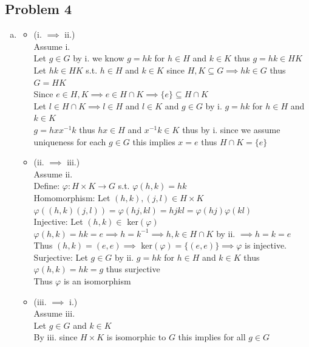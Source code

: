 \documentclass[12pt, letterpaper]{article}
\theoremstyle{definition}
\begin{document}
\subsection*{Problem 4}
\begin{enumerate}[(a)]
    \item \begin{itemize}
        \item (i. $\implies$ ii.)\\
        Assume i.\\
        Let $g \in G$ by i. we know $g=hk$ for $h \in H$ and $k \in K$ thus $g=hk\in HK$\\
        Let $hk \in HK$ s.t. $h \in H$ and $k \in K$ since $H,K \subseteq G \implies hk \in G$ thus $G=HK$\\
        Since $e\in H,K \implies e \in H \cap K \implies \{e\} \subseteq H \cap K$\\
        Let $l \in H \cap K \implies l \in H$ and $l \in K$ and $g \in G$ by i. $g=hk$ for $h \in H$ and $k \in K$\\
        $g=hxx^{-1}k$ thus $hx \in H$ and $x^{-1}k \in K$ thus by i. since we assume uniqueness for each $g \in G$ this implies $x=e$ thus $H \cap K = \{e\}$
        \item (ii. $\implies$ iii.)\\
        Assume ii.\\
        Define: $\varphi: H \times K \rightarrow G$ s.t. $\varphi(h,k)=hk$\\
        Homomorphism: Let $(h,k),(j,l) \in H \times K$\\
        $\varphi((h,k)(j,l))=\varphi(hj,kl)=hjkl=\varphi(hj)\varphi(kl)$\\
        Injective: Let $(h,k) \in$ ker$(\varphi)$\\
        $\varphi(h,k)=hk=e \implies h=k^{-1} \implies h,k \in H \cap K$ by ii. $\implies h=k=e$\\
        Thus $(h,k)=(e,e) \implies$ ker$(\varphi)=\{(e,e)\} \implies \varphi$ is injective.\\
        Surjective: Let $g \in G$ by ii. $g=hk$ for $h \in H$ and $k \in K$ thus $\varphi(h,k)=hk=g$ thus surjective\\
        Thus $\varphi$ is an isomorphism
        \item (iii. $\implies$ i.)\\
        Assume iii.\\
        Let $g \in G$ and $k \in K$\\
        By iii. since $H \times K$ is isomorphic to $G$ this implies for all $g \in G$

\end{itemize}
\end{enumerate}
\end{document}
